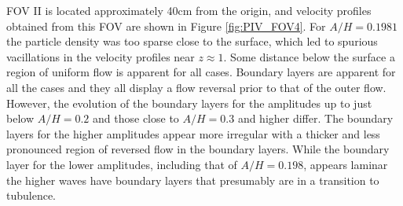 \documentclass[a4paper, 11pt, english, twoside, openright]{article}
\begin{document}
FOV II is located approximately 40cm from the origin, and velocity 
profiles obtained from this FOV are shown in Figure \ref{fig:PIV_FOV4}.
For $A/H=0.1981$ the particle density was too sparse close to the surface, which led to spurious vacillations in the velocity profiles near  $z\approx1$. Some distance below the surface a region of uniform flow is apparent for all cases. 
Boundary layers are apparent for all the cases and they all
display a flow reversal prior to that of the outer flow.
However, the evolution of the boundary layers for the amplitudes up to just below
$A/H=0.2$ and those close to $A/H=0.3$ and higher differ.
The boundary layers for the higher amplitudes appear more irregular
with a thicker and less pronounced region of reversed flow in the 
boundary layers.  
While the boundary layer for the lower amplitudes, including that of $A/H=0.198$, appears laminar the higher waves have boundary layers that 
presumably are in a transition to tubulence.   
\end{document}
